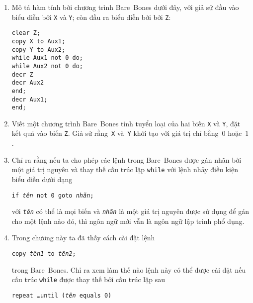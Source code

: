 \begin{multicols}{2}
\begin{enumerate}
  \item Mô tả hàm tính bởi chương trình Bare~Bones dưới đây, với giả sử đầu vào biểu diễn
    bởi \texttt{X} và \texttt{Y}; còn đầu ra biểu diễn bởi bởi \texttt{Z}:
    \begin{flushleft}
      \quad\texttt{clear Z;} \\
      \quad\texttt{copy X to Aux1;} \\
      \quad\texttt{copy Y to Aux2;} \\
      \quad\texttt{while Aux1 not 0 do;} \\
      \quad \quad\texttt{while Aux2 not 0 do;} \\
      \quad \quad\quad \texttt{decr Z} \\
      \quad \quad\quad \texttt{decr Aux2} \\
      \quad \quad\texttt{end;} \\
      \quad \quad \texttt{decr Aux1;} \\
      \quad\texttt{end;} \\
    \end{flushleft}

  \item Viết một chương trình Bare~Bones tính tuyển loại của hai biến \texttt{X} và
    \texttt{Y}, đặt kết quả vào biến \texttt{Z}. Giả sử rằng~\texttt{X} và~\texttt{Y} khởi
    tạo với giá trị chỉ bằng~$0$ hoặc~$1$.

  \item Chỉ ra rằng nếu ta cho phép các lệnh trong Bare~Bones được gán nhãn bởi một giá
    trị nguyên và thay thế cấu trúc lặp \texttt{while} với lệnh nhảy điều kiện biểu diễn
    dưới dạng
    \begin{flushleft}
      \texttt{if \textit{tên} not 0 goto \textit{nhãn};}
    \end{flushleft}
    với \texttt{\it tên} có thể là mọi biến và \texttt{\it nhãn} là một giá trị nguyên
    được sử dụng để gán cho một lệnh nào đó, thì ngôn ngữ mới vẫn là ngôn ngữ lập
    trình phổ dụng.

  \item Trong chương này ta đã thấy cách cài đặt lệnh
    \begin{flushleft}
      \texttt{copy \textit{tên1} to \textit{tên2};}
    \end{flushleft}
    trong Bare~Bones. Chỉ ra xem làm thế nào lệnh này có thể được cài đặt nếu cấu trúc
    \texttt{while} được thay thế bởi cấu trúc lặp sau
    \begin{flushleft}
      \texttt{repeat \dots until (\textit{tên} equals 0)}
    \end{flushleft}


\end{enumerate}
\end{multicols}
